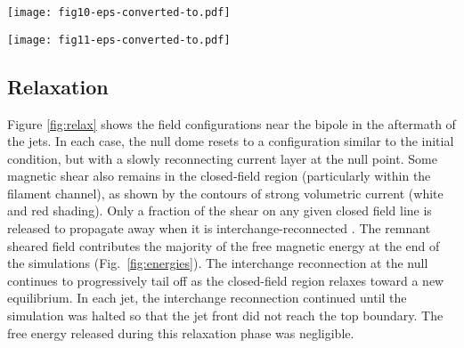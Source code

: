 \documentclass[twocolumn]{aastex6}
\begin{document}
\begin{figure*}
\centering
\texttt{[image: fig10-eps-converted-to.pdf]}
\caption{The post-jet magnetic field. (a) $\theta = +22^\circ$, $t=49$ min $20$ s. (b) $\theta = 0^\circ$, $t= 66$ min $40$ s. (c) $\theta = -22^\circ$, $t=54$ min. Shading shows the non-dimensional electric current density $\vert {\bf J} \vert$ ($\times \,1.5\times10^{-3} \text{A} \,\text{m}^{-2}$ with coronal scalings).}
\label{fig:relax}
\end{figure*}

\begin{figure*}
\centering
\texttt{[image: fig11-eps-converted-to.pdf]}
\caption{Top: cumulative Poynting flux $P(h)$ across surfaces at selected heights $h$ above the photosphere. Bottom: cumulative kinetic-energy flux $K(h)$ across the same surfaces. (a) and (d): $\theta = +22^\circ$. (b) and (e): $\theta = 0^\circ$. (c) and (f): $\theta = -22^\circ$. Note the different vertical and horizontal scales used in each graph.}
\label{fig:fluxes}
\end{figure*}

\subsection{Relaxation}
Figure \ref{fig:relax} shows the field configurations near the bipole in the aftermath of the jets. In each case, the null dome resets to a configuration similar to the initial condition, but with a slowly reconnecting current layer at the null point. Some magnetic shear also remains in the closed-field region (particularly within the filament channel), as shown by the contours of strong volumetric current (white and red shading). Only a fraction of the shear on any given closed field line is released to propagate away when it is interchange-reconnected \citep[e.g.][]{Wyper2016b}. The remnant sheared field contributes the majority of the free magnetic energy at the end of the simulations (Fig.\ \ref{fig:energies}). The interchange reconnection at the null continues to progressively tail off as the closed-field region relaxes toward a new equilibrium. In each jet, the interchange reconnection continued until the simulation was halted so that the jet front did not reach the top boundary. The free energy released during this relaxation phase was negligible. 
\end{document}
